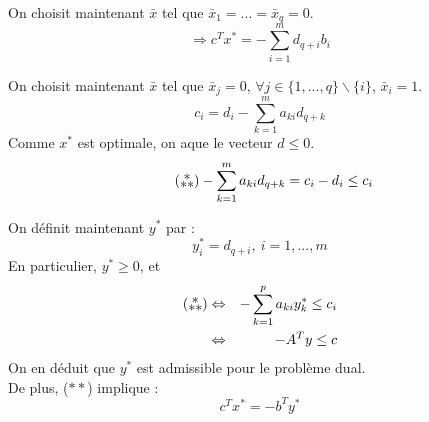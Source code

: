 \begin{dem}
On choisit maintenant $\bar{x}$ tel que $\bar{x}_1=...=\bar{x}_q=0$.
	\begin{equation} \tag{$**$} \Rightarrow c^Tx^*=-\sum_{i=1}^m d_{q+i} b_i\end{equation}

On choisit maintenant $\bar{x}$ tel que $\bar{x}_j=0$, $\forall j\in\{1,...,q\}\backslash\{i\}$, $\bar{x}_i=1$.
	\[c_i=d_i-\sum_{k=1}^m a_{ki}d_{q+k}\]
Comme $x^*$ est optimale, on aque le vecteur $d\leq 0$. 
\begin{equation}
\tag{\raisebox{-.5ex}{\shortstack{\(\ast\)\\[-.5ex]\(\ast\ast\)}}}
-\sum_{k=1}^m a_{ki} d_{q+k} = c_i-d_i \leq c_i\end{equation}

On définit maintenant $y^*$ par : 
	\[y_i^*=d_{q+i},\ i=1,...,m\]
En particulier, $y^*\geq 0$, et 
\begin{eqnarray*}
(\raisebox{-.5ex}{\shortstack{\(\ast\)\\[-.5ex]\(\ast\ast\)}})&\Leftrightarrow& -\sum_{k=1}^p a_{ki}y_k^*\leq c_i\\
							&\Leftrightarrow& -A^Ty\leq c
\end{eqnarray*}
On en déduit que $y^*$ est admissible pour le problème dual.\\
De plus, ($**$) implique :
	\[c^Tx^*=-b^Ty^*\]
\end{dem}

